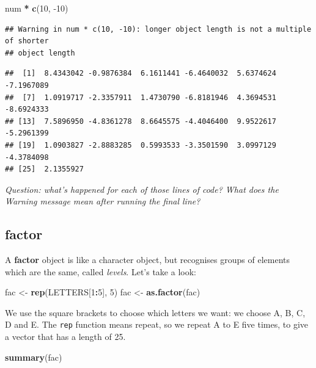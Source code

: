 \documentclass[
]{book}
\newenvironment{Shaded}{\begin{snugshade}}{\end{snugshade}}
\newcommand{\DecValTok}[1]{\textcolor[rgb]{0.00,0.00,0.81}{#1}}
\newcommand{\KeywordTok}[1]{\textcolor[rgb]{0.13,0.29,0.53}{\textbf{#1}}}
\newcommand{\NormalTok}[1]{#1}
\newcommand{\OperatorTok}[1]{\textcolor[rgb]{0.81,0.36,0.00}{\textbf{#1}}}
\newcommand{\StringTok}[1]{\textcolor[rgb]{0.31,0.60,0.02}{#1}}
\begin{document}
\begin{Shaded}
\begin{Highlighting}[]
\NormalTok{num }\OperatorTok{*}\StringTok{ }\KeywordTok{c}\NormalTok{(}\DecValTok{10}\NormalTok{, }\DecValTok{-10}\NormalTok{)}
\end{Highlighting}
\end{Shaded}

\begin{verbatim}
## Warning in num * c(10, -10): longer object length is not a multiple of shorter
## object length
\end{verbatim}

\begin{verbatim}
##  [1]  8.4343042 -0.9876384  6.1611441 -6.4640032  5.6374624 -7.1967089
##  [7]  1.0919717 -2.3357911  1.4730790 -6.8181946  4.3694531 -8.6924333
## [13]  7.5896950 -4.8361278  8.6645575 -4.4046400  9.9522617 -5.2961399
## [19]  1.0903827 -2.8883285  0.5993533 -3.3501590  3.0997129 -4.3784098
## [25]  2.1355927
\end{verbatim}

\emph{Question: what's happened for each of those lines of code? What does the Warning
message mean after running the final line?}\\
\hspace*{0.333em}

\hypertarget{factor}{%
\subsection{factor}\label{factor}}

A \textbf{factor} object is like a character object, but recognises groups of elements
which are the same, called \emph{levels}. Let's take a look:

\begin{Shaded}
\begin{Highlighting}[]
\NormalTok{fac <-}\StringTok{ }\KeywordTok{rep}\NormalTok{(LETTERS[}\DecValTok{1}\OperatorTok{:}\DecValTok{5}\NormalTok{], }\DecValTok{5}\NormalTok{)}
\NormalTok{fac <-}\StringTok{ }\KeywordTok{as.factor}\NormalTok{(fac)}
\end{Highlighting}
\end{Shaded}

We use the square brackets to choose which letters we
want: we choose A, B, C, D and E. The \texttt{rep} function means repeat, so we
repeat A to E five times, to give a vector that has a length of 25.

\begin{Shaded}
\begin{Highlighting}[]
\KeywordTok{summary}\NormalTok{(fac)}
\end{Highlighting}
\end{Shaded}
\end{document}
